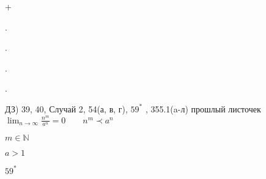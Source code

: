 \documentclass{book}
\begin{document}
+

.

.

.

.

ДЗ) 39, 40, Случай 2, 54(а, в, г), $59^*$ , 355.1(a-л) прошлый листочек
$\lim_{n \to \infty}\frac{n^m}{a^n} = 0\qquad n^m \prec a^n$

$m\in \mathds{N}$

$a>1$

$59^*$
\end{document}
